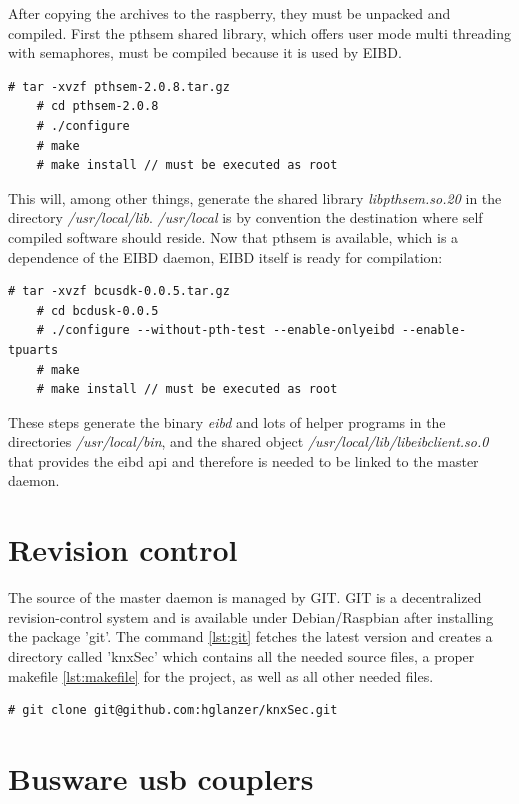 After copying the archives to the raspberry, they must be unpacked and compiled. First the pthsem shared library, which offers user mode multi
threading with semaphores, must be compiled because it is used by EIBD. 

\begin{lstlisting}[style=BashInputStyle]
    # tar -xvzf pthsem-2.0.8.tar.gz
    # cd pthsem-2.0.8
    # ./configure
    # make
    # make install // must be executed as root
\end{lstlisting}

This will, among other things, generate the shared library \textit{libpthsem.so.20} in the directory \textit{/usr/local/lib}. \textit{/usr/local}
 is by convention the destination where self compiled software should reside.
Now that pthsem is available, which is a dependence of the EIBD daemon, EIBD itself is ready for compilation:

\begin{lstlisting}[style=BashInputStyle]
    # tar -xvzf bcusdk-0.0.5.tar.gz
    # cd bcdusk-0.0.5
    # ./configure --without-pth-test --enable-onlyeibd --enable-tpuarts
    # make
    # make install // must be executed as root
\end{lstlisting}

These steps generate the binary \textit{eibd} and lots of helper programs in the directories \textit{/usr/local/bin}, and the shared object
\textit{/usr/local/lib/libeibclient.so.0} that provides the \gls{eibd} \gls{api} and therefore is needed to be linked to the master daemon. 

\section{Revision control}

The source of the master daemon is managed by GIT. GIT is a decentralized revision-control system and is available under Debian/Raspbian after installing
the package 'git'. The command \ref{lst:git} fetches the latest version and creates a directory called 'knxSec' which contains all the needed source files,
a proper makefile \ref{lst:makefile} for the project, as well as all other needed files.

\begin{lstlisting}[style=BashInputStyle,label=lst:git]
    # git clone git@github.com:hglanzer/knxSec.git
\end{lstlisting}

\section{Busware \gls{usb} couplers}

